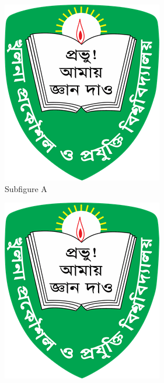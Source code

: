 \documentclass[10pt]{article}
\begin{document}
\begin{figure}[H]
    \centering
    \begin{subfigure}[b]{0.4\textwidth}
        \centering
        \includegraphics[width=\textwidth]{kuet-logo-F2194AF03E-seeklogo.com.png}
        \caption{Subfigure A}
        \label{fig:sub1}
    \end{subfigure}
    \hfill
    \begin{subfigure}[b]{0.4\textwidth}
        \centering
        \includegraphics[width=\textwidth]{kuet-logo-F2194AF03E-seeklogo.com.png}

\end{subfigure}
\end{figure}
\end{document}
